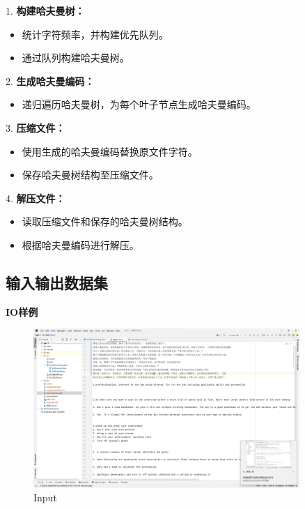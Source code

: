 \documentclass[UTF8]{ctexart}
\begin{document}
1. \textbf{构建哈夫曼树：}
   \begin{itemize}
       \item 统计字符频率，并构建优先队列。
       \item 通过队列构建哈夫曼树。
   \end{itemize}

2. \textbf{生成哈夫曼编码：}
   \begin{itemize}
       \item 递归遍历哈夫曼树，为每个叶子节点生成哈夫曼编码。
   \end{itemize}

3. \textbf{压缩文件：}
   \begin{itemize}
       \item 使用生成的哈夫曼编码替换原文件字符。
       \item 保存哈夫曼树结构至压缩文件。
   \end{itemize}

4. \textbf{解压文件：}
   \begin{itemize}
       \item 读取压缩文件和保存的哈夫曼树结构。
       \item 根据哈夫曼编码进行解压。
   \end{itemize}


\subsection*{输入输出数据集}

\textbf{IO样例}

\begin{figure}[htbp] 
  \centering
  \includegraphics[width=0.9\textwidth]{input.png} %
  \caption{Input}
  \label{fig:Input}
\end{figure}
\end{document}
